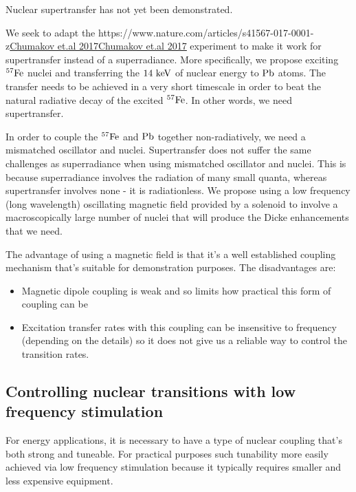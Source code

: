 \documentclass[
]{article}
\let\oldhref\href
\renewcommand{\href}[2]{\ifx#1\urlprefix\oldhref{#1}{#2}\else\uline{\oldhref{#1}{#2}}\fi}
\renewcommand{\[}{\begin{equation}}
\renewcommand{\]}{\end{equation}}
\providecommand{\tightlist}{%
  \setlength{\itemsep}{0pt}\setlength{\parskip}{0pt}}
\begin{document}
Nuclear supertransfer has not yet been demonstrated.

We seek to adapt the
\href{https://www.nature.com/articles/s41567-017-0001-z}{Chumakov et.al
2017} experiment to make it work for supertransfer instead of a
superradiance. More specifically, we propose exciting \(\rm ^{57}Fe\)
nuclei and transferring the \(14 \ \rm keV\) of nuclear energy to
\(\rm Pb\) atoms. The transfer needs to be achieved in a very short
timescale in order to beat the natural radiative decay of the excited
\(\rm ^{57}Fe\). In other words, we need supertransfer.

In order to couple the \(\rm ^{57}Fe\) and \(\rm Pb\) together
non-radiatively, we need a mismatched oscillator and nuclei.
Supertransfer does not suffer the same challenges as superradiance when
using mismatched oscillator and nuclei. This is because superradiance
involves the radiation of many small quanta, whereas supertransfer
involves none - it is radiationless. We propose using a low frequency
(long wavelength) oscillating magnetic field provided by a solenoid to
involve a macroscopically large number of nuclei that will produce the
Dicke enhancements that we need.

The advantage of using a magnetic field is that it's a well established
coupling mechanism that's suitable for demonstration purposes. The
disadvantages are:

\begin{itemize}
\tightlist
\item
  Magnetic dipole coupling is weak and so limits how practical this form
  of coupling can be
\item
  Excitation transfer rates with this coupling can be insensitive to
  frequency (depending on the details) so it does not give us a reliable
  way to control the transition rates.
\end{itemize}

\subsection{Controlling nuclear transitions with low frequency
stimulation}\label{controlling-nuclear-transitions-with-low-frequency-stimulation}

For energy applications, it is necessary to have a type of nuclear
coupling that's both strong and tuneable. For practical purposes such
tunability more easily achieved via low frequency stimulation because it
typically requires smaller and less expensive equipment.
\end{document}
